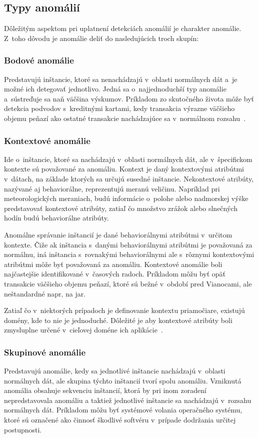 \documentclass[a4paper,twoside,slovak,12pt]{article}
\begin{document}
\subsection{Typy anomálií}
Dôležitým aspektom pri uplatnení detekciách anomálií je charakter anomálie.
Z~toho dôvodu je anomálie deliť do nasledujúcich troch skupín:

\subsubsection{Bodové anomálie}
Predstavujú inštancie, ktoré sa nenachádzajú v~oblasti normálnych dát a~je
možné ich detegovať jednotlivo. Jedná sa o~najjednoduchší typ anomálie
a~sústreďuje sa naň väčšina výskumov. Príkladom zo skutočného života môže byť
detekcia podvodov s~kreditnými kartami, kedy transakcia výrazne väčšieho objemu
peňazí ako ostatné transakcie nachádzajúce sa v~normálnom rozsahu~\cite{Chandola2009}.

\subsubsection{Kontextové anomálie}
Ide o~inštancie, ktoré sa nachádzajú v~oblasti normálnych dát, ale v~špecifickom
kontexte sú považované za anomáliu. Kontext je daný kontextovými atribútmi
v~dátach, na základe ktorých sa určujú susedné inštancie. Nekontextové atribúty,
nazývané aj behaviorálne, reprezentujú meranú veličinu. Napríklad pri
meteorologických meraniach, budú informácie o~polohe alebo nadmorskej výške
predstavovať kontextové atribúty, zatiaľ čo množstvo zrážok alebo slnečných hodín
budú behaviorálne atribúty.

Anomálne správanie inštancií je dané behaviorálnymi atribútmi v~určitom kontexte.
Čiže ak inštancia s~danými behaviorálnymi atribútmi je považovaná za normálnu,
iná inštancia s~rovnakými behaviorálnymi ale s~rôznymi kontextovými atribútmi
môže byť považovaná za anomáliu. Kontextové anomálie boli najčastejšie
identifikované v~časových radoch. Príkladom môžu byť opäť transakcie väčšieho
objemu peňazí, ktoré sú bežné v~období pred Vianocami, ale neštandardné napr, na jar.

Zatiaľ čo v~niektorých prípadoch je definovanie kontextu priamočiare, existujú
domény, kde to nie je jednoduché. Dôležité je aby kontextové atribúty boli
zmysluplne určené v~cieľovej doméne ich aplikácie~\cite{Chandola2009}.

\subsubsection{Skupinové anomálie}
Predstavujú anomálie, kedy sa jednotlivé inštancie nachádzajú v~oblasti
normálnych dát, ale skupina týchto inštancií tvorí spolu anomáliu. Vzniknutá
anomália obsahuje sekvenciu inštancií, ktorá by pri inom zoradení nepredstavovala
anomáliu a taktiež jednotlivé inštancie sa nachádzajú v~rozsahu normálnych dát.
Príkladom môžu byť systémové volania operačného systému, ktoré sú označené ako
činnosť škodlivé softvéru v~prípade dodržania určitej postupnosti.
\end{document}
